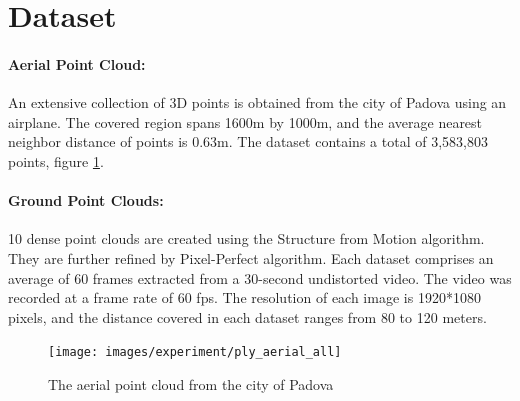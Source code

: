 \documentclass[11pt]{article}
\begin{document}
    \section{Dataset}
    \paragraph{Aerial Point Cloud:} An extensive collection of 3D points is obtained from the city of Padova
    using an airplane. The covered region spans 1600m by 1000m, and the average nearest neighbor distance
    of points is 0.63m. The dataset contains a total of 3,583,803 points, figure \ref{fig:ply_aerial_all}.
    \paragraph{Ground Point Clouds:} 10 dense point clouds are created using the Structure from Motion algorithm.
    They are further refined by Pixel-Perfect algorithm. Each dataset comprises an average of
    60 frames extracted from a 30-second undistorted video. The video was recorded at a frame rate of 60 fps.
    The resolution of each image is 1920*1080 pixels, and the distance covered in each dataset ranges from 80 to 120 meters.

    \begin{figure}
    \centering
    \texttt{[image: images/experiment/ply\_aerial\_all]}
    \caption{The aerial point cloud from the city of Padova}
    \label{fig:ply_aerial_all}
    \end{figure}
\end{document}
